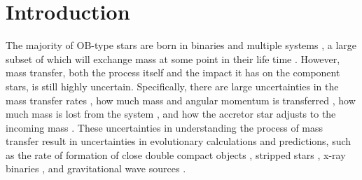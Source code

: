 \documentclass[twocolumn, twocolappendix, oneside]{aastex631}
\begin{document}

{\hypersetup{linkcolor=black}\listoftodos}

\section{Introduction} \label{sec:intro}

The majority of OB-type stars are born in binaries and multiple systems \citep[e.g.][]{Mason+2009, Almeida+2017, Moe+2017}, a large subset of which will exchange mass at some point in their life time \citep[e.g][]{Sana+2012,deMink+2014}. However, mass transfer, both the process itself and the impact it has on the component stars, is still highly uncertain. Specifically, there are large uncertainties in the mass transfer rates \citep{Dray+2007}, how much mass and angular momentum is transferred \citep{Packet+1981,Renzo+2021}, how much mass is lost from the system \citep{Tout2012}, and how the accretor star adjusts to the incoming mass \citep{Hellings1983,Braun+1995,Cantiello+2007,Staritsin+2019,Renzo+2023}. These uncertainties in understanding the process of mass transfer result in uncertainties in evolutionary calculations and predictions, such as the rate of formation of close double compact objects \citep{Nelemans+2005,Toonen+2013,Marchant2021+}, stripped stars \citep{Crowther2007,Heber2016,Gotberg+2020}, x-ray binaries \citep{Nelemans+2010}, and gravitational wave sources \citep[e.g.][]{Broekgaarden+2022,Iorio+2023}.


\end{document}
